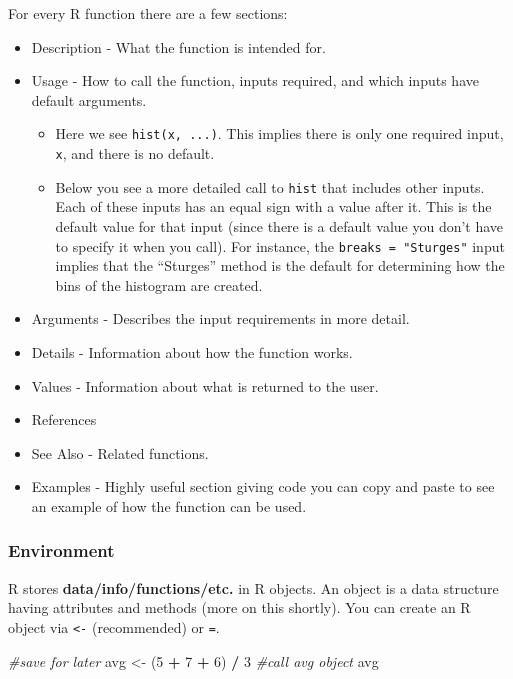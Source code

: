 \documentclass[
]{book}
\newenvironment{Shaded}{\begin{snugshade}}{\end{snugshade}}
\newcommand{\CommentTok}[1]{\textcolor[rgb]{0.56,0.35,0.01}{\textit{#1}}}
\newcommand{\DecValTok}[1]{\textcolor[rgb]{0.00,0.00,0.81}{#1}}
\newcommand{\NormalTok}[1]{#1}
\newcommand{\OperatorTok}[1]{\textcolor[rgb]{0.81,0.36,0.00}{\textbf{#1}}}
\newcommand{\StringTok}[1]{\textcolor[rgb]{0.31,0.60,0.02}{#1}}
\providecommand{\tightlist}{%
  \setlength{\itemsep}{0pt}\setlength{\parskip}{0pt}}
\theoremstyle{definition}
\theoremstyle{definition}
\theoremstyle{definition}
\theoremstyle{remark}
\begin{document}
For every R function there are a few sections:

\begin{itemize}
\item
  Description - What the function is intended for.
\item
  Usage - How to call the function, inputs required, and which inputs have default arguments.

  \begin{itemize}
  \tightlist
  \item
    Here we see \texttt{hist(x,\ ...)}. This implies there is only one required input, \texttt{x}, and there is no default.\\
  \item
    Below you see a more detailed call to \texttt{hist} that includes other inputs. Each of these inputs has an equal sign with a value after it. This is the default value for that input (since there is a default value you don't have to specify it when you call). For instance, the \texttt{breaks\ =\ "Sturges"} input implies that the ``Sturges'' method is the default for determining how the bins of the histogram are created.
  \end{itemize}
\item
  Arguments - Describes the input requirements in more detail.
\item
  Details - Information about how the function works.
\item
  Values - Information about what is returned to the user.
\item
  References
\item
  See Also - Related functions.
\item
  Examples - Highly useful section giving code you can copy and paste to see an example of how the function can be used.
\end{itemize}

\hypertarget{environment}{%
\subsubsection{Environment}\label{environment}}

R stores \textbf{data/info/functions/etc.} in R objects. An object is a data structure having attributes and methods (more on this shortly). You can create an R object via \texttt{\textless{}-} (recommended) or \texttt{=}.

\begin{Shaded}
\begin{Highlighting}[]
\CommentTok{#save for later}
\NormalTok{avg <-}\StringTok{ }\NormalTok{(}\DecValTok{5} \OperatorTok{+}\StringTok{ }\DecValTok{7} \OperatorTok{+}\StringTok{ }\DecValTok{6}\NormalTok{) }\OperatorTok{/}\StringTok{ }\DecValTok{3}
\CommentTok{#call avg object}
\NormalTok{avg}
\end{Highlighting}
\end{Shaded}
\end{document}
